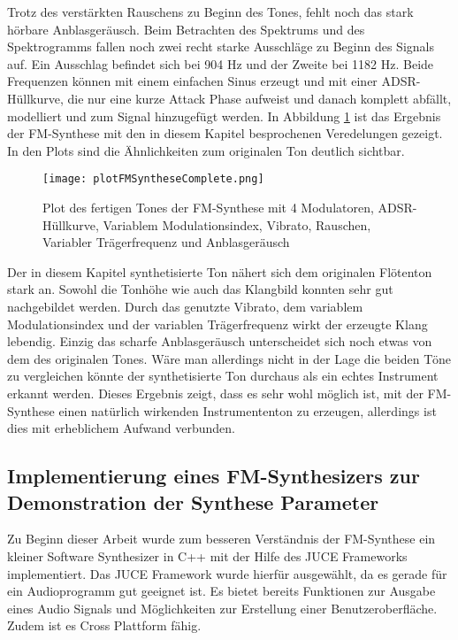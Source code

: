Trotz des verstärkten Rauschens zu Beginn des Tones, fehlt noch das stark hörbare Anblasgeräusch. Beim Betrachten des Spektrums und des Spektrogramms fallen noch zwei recht starke Ausschläge zu Beginn des Signals auf. Ein Ausschlag befindet sich bei 904 Hz und der Zweite bei 1182 Hz. Beide Frequenzen können mit einem einfachen Sinus erzeugt und mit einer ADSR-Hüllkurve, die nur eine kurze Attack Phase aufweist und danach komplett abfällt, modelliert und zum Signal hinzugefügt werden. In Abbildung \ref{fig:plotFMSyntheseComplete} ist das Ergebnis der FM-Synthese mit den in diesem Kapitel besprochenen Veredelungen gezeigt. In den Plots sind die Ähnlichkeiten zum originalen Ton deutlich sichtbar.

\begin{figure} [h!t!b!]
\centering
  \texttt{[image: plotFMSyntheseComplete.png]}
\caption{Plot des fertigen Tones der FM-Synthese mit 4 Modulatoren, ADSR-Hüllkurve, Variablem Modulationsindex, Vibrato, Rauschen, Variabler Trägerfrequenz und Anblasgeräusch}
\label{fig:plotFMSyntheseComplete}
\end{figure}

Der in diesem Kapitel synthetisierte Ton nähert sich dem originalen Flötenton stark an. Sowohl die Tonhöhe wie auch das Klangbild konnten sehr gut nachgebildet werden. Durch das genutzte Vibrato, dem variablem Modulationsindex und der variablen Trägerfrequenz wirkt der erzeugte Klang lebendig. Einzig das scharfe Anblasgeräusch unterscheidet sich noch etwas von dem des originalen Tones. Wäre man allerdings nicht in der Lage die beiden Töne zu vergleichen könnte der synthetisierte Ton durchaus als ein echtes Instrument erkannt werden. Dieses Ergebnis zeigt, dass es sehr wohl möglich ist, mit der FM-Synthese einen natürlich wirkenden Instrumententon zu erzeugen, allerdings ist dies mit erheblichem Aufwand verbunden.


\FloatBarrier
\subsection{Implementierung eines FM-Synthesizers zur Demonstration der Synthese Parameter}

Zu Beginn dieser Arbeit wurde zum besseren Verständnis der FM-Synthese ein kleiner Software Synthesizer in C++ mit der Hilfe des JUCE Frameworks implementiert. Das JUCE Framework wurde hierfür ausgewählt, da es gerade für ein Audioprogramm gut geeignet ist. Es bietet bereits Funktionen zur Ausgabe eines Audio Signals und Möglichkeiten zur Erstellung einer Benutzeroberfläche. Zudem ist es Cross Plattform fähig.

